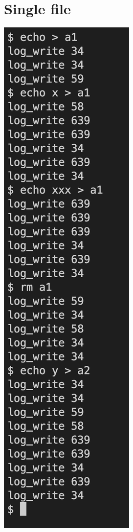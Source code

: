 \documentclass[9pt]{amsart}
\begin{document}
    \section{Single file}
    \includegraphics[scale = 0.6]{p1_out.png}
    
\end{document}
